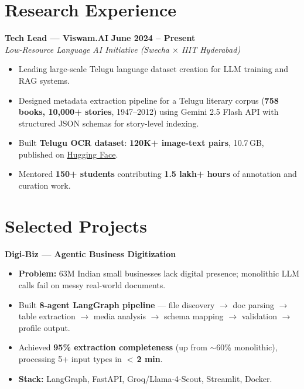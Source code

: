 \documentclass[letterpaper,10pt]{article}
\newcommand{\projectheading}[3]{%
  \noindent\textbf{#1}\hfill{\small #2\quad#3}%
}
\begin{document}
\section{Research Experience}
\textbf{Tech Lead — Viswam.AI} \hfill \textbf{June 2024 -- Present} \\
\textit{Low-Resource Language AI Initiative (Swecha $\times$ IIIT Hyderabad)}
\begin{itemize}[leftmargin=0.2in, itemsep=0pt, topsep=2pt, parsep=0pt]
\item Leading large-scale Telugu language dataset creation for LLM training and RAG systems.
\item Designed metadata extraction pipeline for a Telugu literary corpus (\textbf{758 books, 10,000+ stories}, 1947--2012) using Gemini 2.5 Flash API with structured JSON schemas for story-level indexing.
\item Built \textbf{Telugu OCR dataset}: \textbf{120K+ image-text pairs}, 10.7\,GB, published on \href{https://huggingface.co/datasets/Divs0910/telugu-ocr-dataset}{Hugging Face}.
\item Mentored \textbf{150+ students} contributing \textbf{1.5 lakh+ hours} of annotation and curation work.
\end{itemize}

\section{Selected Projects}

\projectheading{Digi-Biz — Agentic Business Digitization}%
{\href{https://github.com/DIVYANSH-TEJA-09/business-digitization-agent}{\faGithub}}%
{\href{https://business-digitization-agent-two.vercel.app}{\faExternalLink*}}
\begin{itemize}[leftmargin=0.2in, itemsep=0pt, topsep=2pt, parsep=0pt]
\item \textbf{Problem:} 63M Indian small businesses lack digital presence; monolithic LLM calls fail on messy real-world documents.
\item Built \textbf{8-agent LangGraph pipeline} — file discovery $\rightarrow$ doc parsing $\rightarrow$ table extraction $\rightarrow$ media analysis $\rightarrow$ schema mapping $\rightarrow$ validation $\rightarrow$ profile output.
\item Achieved \textbf{95\% extraction completeness} (up from $\sim$60\% monolithic), processing 5+ input types in \textbf{$<$\,2 min}.
\item \textbf{Stack:} LangGraph, FastAPI, Groq/Llama-4-Scout, Streamlit, Docker.
\end{itemize}
\vspace{2pt}
\end{document}
